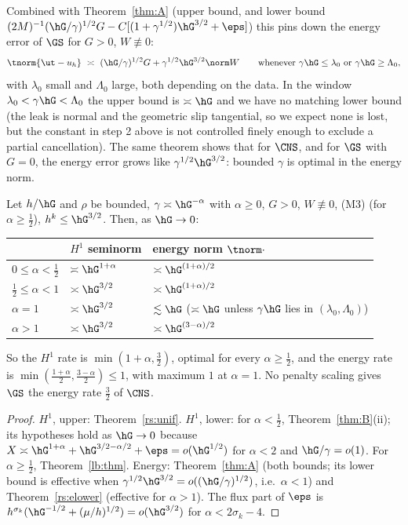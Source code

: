 Combined with Theorem~\ref{thm:A} (upper bound, and lower bound $(2M)^{-1}(\hG/\gamma)^{1/2}G-C[(1+\gamma^{1/2})\hG^{3/2}+\eps]$) this pins down the energy error of $\GS$ for $G>0$, $W\not\equiv0$:
\[
\tnorm{\ut-u_h}\ \asymp\ (\hG/\gamma)^{1/2}G+\gamma^{1/2}\hG^{3/2}\norm W\qquad\text{whenever }\gamma\hG\le\lambda_0\text{ or }\gamma\hG\ge\Lambda_0,
\]
with $\lambda_0$ small and $\Lambda_0$ large, both depending on the data. In the window $\lambda_0<\gamma\hG<\Lambda_0$ the upper bound is $\asymp\hG$ and we have no matching lower bound (the leak is normal and the geometric slip tangential, so we expect none is lost, but the constant in step 2 above is not controlled finely enough to exclude a partial cancellation). The same theorem shows that for $\CNS$, and for $\GS$ with $G=0$, the energy error grows like $\gamma^{1/2}\hG^{3/2}$: bounded $\gamma$ is optimal in the energy norm.

\begin{corollary}\label{rs:rates}
Let $h/\hG$ and $\rho$ be bounded, $\gamma\asymp\hG^{-\alpha}$ with $\alpha\ge0$, $G>0$, $W\not\equiv0$, (M3) (for $\alpha\ge\frac12$), $h^k\le\hG^{3/2}$. Then, as $\hG\to0$:
\begin{center}
\begin{tabular}{lll}
\toprule
& $H^1$ seminorm & energy norm $\tnorm\cdot$\\
\midrule
$0\le\alpha<\frac12$ & $\asymp\hG^{1+\alpha}$ & $\asymp\hG^{(1+\alpha)/2}$\\
$\frac12\le\alpha<1$ & $\asymp\hG^{3/2}$ & $\asymp\hG^{(1+\alpha)/2}$\\
$\alpha=1$ & $\asymp\hG^{3/2}$ & $\lesssim\hG$ ($\asymp\hG$ unless $\gamma\hG$ lies in $(\lambda_0,\Lambda_0)$)\\
$\alpha>1$ & $\asymp\hG^{3/2}$ & $\asymp\hG^{(3-\alpha)/2}$\\
\bottomrule
\end{tabular}
\end{center}
So the $H^1$ rate is $\min(1+\alpha,\frac32)$, optimal for every $\alpha\ge\frac12$, and the energy rate is $\min(\frac{1+\alpha}2,\frac{3-\alpha}2)\le1$, with maximum $1$ at $\alpha=1$. No penalty scaling gives $\GS$ the energy rate $\frac32$ of $\CNS$.
\end{corollary}

\begin{proof}
$H^1$, upper: Theorem~\ref{rs:unif}. $H^1$, lower: for $\alpha<\frac12$, Theorem~\ref{thm:B}(ii); its hypotheses hold as $\hG\to0$ because $X\asymp\hG^{1+\alpha}+\hG^{3/2-\alpha/2}+\eps=o(\hG^{1/2})$ for $\alpha<2$ and $\hG/\gamma=o(1)$. For $\alpha\ge\frac12$, Theorem~\ref{lb:thm}. Energy: Theorem~\ref{thm:A} (both bounds; its lower bound is effective when $\gamma^{1/2}\hG^{3/2}=o((\hG/\gamma)^{1/2})$, i.e.\ $\alpha<1$) and Theorem~\ref{rs:elower} (effective for $\alpha>1$). The flux part of $\eps$ is $h^{\sigma_k}(\hG^{-1/2}+(\mu/h)^{1/2})=o(\hG^{3/2})$ for $\alpha<2\sigma_k-4$.
\end{proof}

